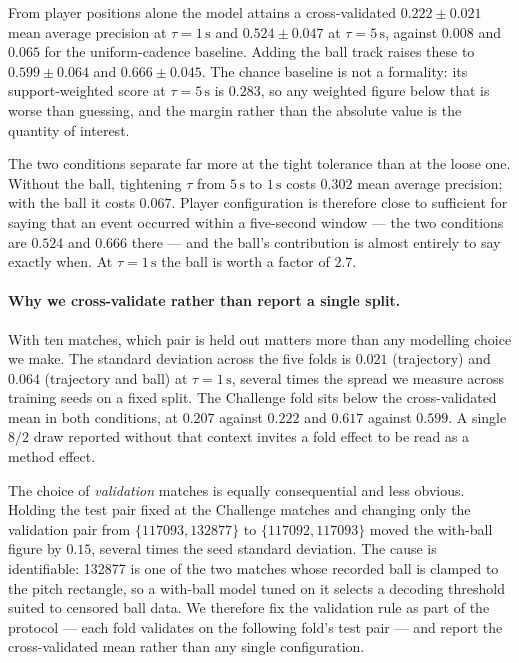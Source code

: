 From player positions alone the model attains a cross-validated $0.222 \pm 0.021$ mean
average precision at $\tau = 1\,\text{s}$ and $0.524 \pm 0.047$ at $\tau = 5\,\text{s}$,
against $0.008$ and $0.065$ for the uniform-cadence baseline. Adding the ball track raises
these to $0.599 \pm 0.064$ and $0.666 \pm 0.045$. The chance baseline is not a formality: its
support-weighted score at $\tau = 5\,\text{s}$ is $0.283$, so any weighted figure below that
is worse than guessing, and the margin rather than the absolute value is the quantity of
interest.

The two conditions separate far more at the tight tolerance than at the loose one. Without
the ball, tightening $\tau$ from $5\,\text{s}$ to $1\,\text{s}$ costs $0.302$ mean average
precision; with the ball it costs $0.067$. Player configuration is therefore close to
sufficient for saying that an event occurred within a five-second window --- the two
conditions are $0.524$ and $0.666$ there --- and the ball's contribution is almost entirely
to say exactly when. At $\tau = 1\,\text{s}$ the ball is worth a factor of $2.7$.

\paragraph{Why we cross-validate rather than report a single split.}
With ten matches, which pair is held out matters more than any modelling choice we make. The
standard deviation across the five folds is $0.021$ (trajectory) and $0.064$ (trajectory and
ball) at $\tau = 1\,\text{s}$, several times the spread we measure across training seeds on a
fixed split. The Challenge fold sits below the cross-validated mean in both conditions,
at $0.207$ against $0.222$ and $0.617$ against $0.599$. A single $8/2$ draw reported without
that context invites a fold effect to be read as a method effect.

The choice of \emph{validation} matches is equally consequential and less obvious. Holding the
test pair fixed at the Challenge matches and changing only the validation pair from
$\{117093, 132877\}$ to $\{117092, 117093\}$ moved the with-ball figure by $0.15$, several
times the seed standard deviation. The cause is identifiable: 132877 is one of the two matches
whose recorded ball is clamped to the pitch rectangle, so a with-ball model tuned on it selects
a decoding threshold suited to censored ball data. We therefore fix the validation rule as part
of the protocol --- each fold validates on the following fold's test pair --- and report the
cross-validated mean rather than any single configuration.

